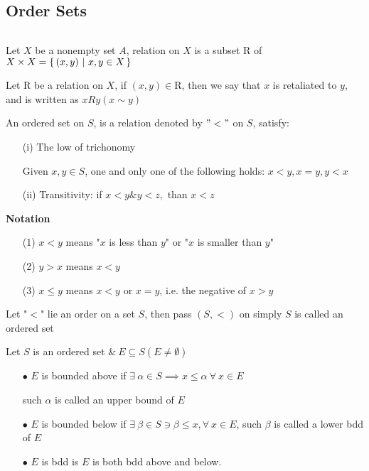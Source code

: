 \newpage

\subsection{Order Sets}

\begin{defn}$ $


	Let $X$ be a nonempty set $A$, relation on $X$ is a subset $\mathrm{R}$ of $X \times X = \left\{ \,(x,y)~|~x,y \in X \,\right\}$
	
	Let $\mathrm{R}$ be a relation on $X$, if $(x,y) \in \mathrm{R}$, then we say that $x$ is retaliated to $y$, and is written as $xRy(x\sim y)$
\end{defn}

\begin{defn}
	An ordered set on $S$, is a relation denoted by $"<"$ on $S$, satisfy:
	
	\begin{enumerate}
		\item[(i)] The low of trichonomy
		
		Given $x,y \in S$, one and only one of the following holds: $x<y,x=y,y<x$
		
		\item[(ii)] Transitivity: if $x < y \& y < z,$ than $x<z$
	\end{enumerate} 
	
	\textbf{Notation}
	
	\begin{enumerate}
		\item[(1)] $x<y$ means "$x$ is less than $y$" or "$x$ is smaller than $y$"
		\item[(2)] $y > x$ means $x<y$
		\item[(3)] $x \leq y$ means $x < y$ or $x = y$, i.e. the negative of $x > y$
	\end{enumerate}
\end{defn}


\begin{defn}
	Let "$<$" lie an order on a set $S$, then pass $(S,<)$ on simply $S$ is called an ordered set
\end{defn}

\begin{defn}
	Let $S$ is an ordered set $\&~ E \subseteq S(E \neq \emptyset)$
	
	\begin{enumerate}
		\item[$\bullet$] $E$ is bounded above if $\exists~ \alpha \in S \implies x \leq \alpha~\forall ~x \in E$
		
		such $\alpha$ is called an upper bound of $E$
		 
		\item[$\bullet$] $E$ is bounded below if $\exists~ \beta \in S \ni \beta \leq x, \forall~x\in E$, such $\beta$ is called a lower bdd of $E$
		\item[$\bullet$] $E$ is bdd is $E$ is both bdd above and below. 
	\end{enumerate}
\end{defn}

